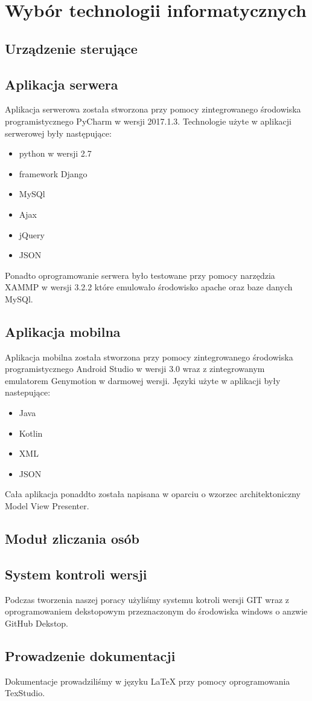 \newpage\section{Wybór technologii informatycznych} \label{sec:technologie}
\subsection{Urządzenie sterujące}

\newpage
\subsection{Aplikacja serwera}
Aplikacja serwerowa została stworzona przy pomocy zintegrowanego środowiska programistycznego PyCharm w wersji 2017.1.3. Technologie użyte w aplikacji serwerowej były następujące:
\begin{itemize}
	\item python w wersji 2.7
	\item framework Django
	\item MySQl 
	\item Ajax
	\item jQuery
	\item JSON
\end{itemize}
Ponadto oprogramowanie serwera było testowane przy pomocy narzędzia XAMMP w wersji 3.2.2 które emulowało środowisko apache oraz baze danych MySQl.

\newpage
\subsection{Aplikacja mobilna}
Aplikacja mobilna została stworzona przy pomocy zintegrowanego środowiska programistycznego Android Studio w wersji 3.0 wraz z zintegrowanym emulatorem Genymotion w darmowej wersji. Języki użyte w aplikacji były nastepujące:
\begin{itemize}
	\item Java 
	\item Kotlin
	\item XML
	\item JSON
\end{itemize}
Cała aplikacja ponaddto została napisana w oparciu o wzorzec architektoniczny Model View Presenter. 

\newpage
\subsection{Moduł zliczania osób}

\newpage
\subsection{System kontroli wersji}
Podczas tworzenia naszej poracy użyliśmy systemu kotroli wersji GIT wraz z  oprogramowaniem dekstopowym przeznaczonym do środowiska windows o anzwie GitHub Dekstop.

\newpage
\subsection{Prowadzenie dokumentacji}
 Dokumentacje prowadziliśmy w języku LaTeX przy pomocy oprogramowania TexStudio. 
